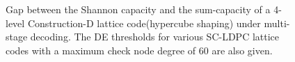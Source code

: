 \begin{figure}
\centering
\setlength{}
\setlength{}

\caption{Gap between the Shannon capacity and the sum-capacity of a 4-level Construction-D lattice code(hypercube shaping) under multi-stage decoding. The DE thresholds for various SC-LDPC lattice codes with a maximum check node degree of $60$ are also given.}	
\label{Fig:ShapingLoss}	
\end{figure}

%

